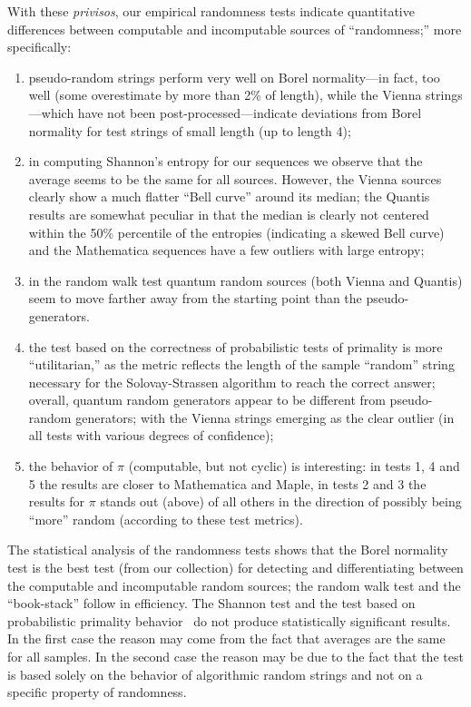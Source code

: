 \documentclass[10pt]{article}%
\begin{document}
With these {\em privisos}, our empirical randomness tests indicate quantitative differences between computable
and incomputable sources of ``randomness;''
more specifically:
\begin{enumerate}
\item
pseudo-random strings perform very well on Borel normality---in fact, too well (some overestimate by more than 2\%
of length), while the Vienna strings---which have not been post-processed---indicate
deviations from Borel normality for test strings of small length (up to length 4);

\item in computing Shannon's entropy for our sequences we observe that
the average seems to be the same for all sources. However,
the Vienna sources clearly show a much flatter ``Bell curve'' around
its median; the Quantis results are somewhat peculiar in that the median is
clearly not centered within the 50\% percentile of the entropies
(indicating a skewed Bell curve) and the Mathematica sequences have
a few outliers with large entropy;

\item
in the random walk test quantum random sources (both Vienna and Quantis)
seem to move farther away from the starting point than the pseudo-generators.
\item
the test based on the correctness of probabilistic tests of primality is  more ``utilitarian,''
as the metric reflects the length of the sample ``random'' string necessary for the Solovay-Strassen algorithm
to reach the correct answer; overall, quantum random generators appear to be different from pseudo-random
 generators; with the Vienna strings emerging as the clear outlier
(in all tests with various degrees of confidence);

\item
the behavior of $\pi$ (computable, but not cyclic) is interesting: in tests 1, 4
and 5 the results are closer to Mathematica and Maple, in tests 2 and 3 the
results for $\pi$ stands out (above) of all others in the direction of possibly
being ``more'' random (according to these test metrics).
\end{enumerate}


The statistical analysis of the randomness tests shows that the Borel normality test is the best test
(from our collection) for detecting and differentiating between the computable and incomputable random sources;
the random walk test and the ``book-stack''  follow in efficiency.
  The Shannon test and the test based on probabilistic primality behavior~\cite{calude:02} do not produce
 statistically significant results.
In the first case the reason may come from the fact  that averages are the same for all samples. In the second case  the reason  may be due to the fact that the test is based solely on the behavior of algorithmic random strings and not on a specific property of randomness.
\end{document}
